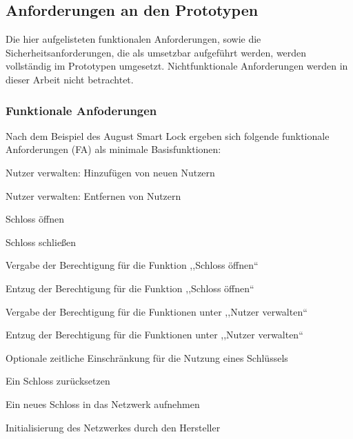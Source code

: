 \subsection{Anforderungen an den Prototypen}
\label{sec:prototype_requirements}
    Die hier aufgelisteten funktionalen Anforderungen, sowie die Sicherheitsanforderungen, die als umsetzbar aufgeführt werden, werden vollständig im Prototypen umgesetzt. 
    Nichtfunktionale Anforderungen werden in dieser Arbeit nicht betrachtet. 
    
\subsubsection{Funktionale Anfoderungen}
\label{sec:prototype_func_req}
    Nach dem Beispiel des August Smart Lock ergeben sich folgende funktionale Anforderungen (FA) als minimale Basisfunktionen:
    \begin{FA}[noitemsep]
        \item \label{fa:1}Nutzer verwalten: Hinzufügen von neuen Nutzern
        \item \label{fa:2}Nutzer verwalten: Entfernen von Nutzern
        \item \label{fa:3}Schloss öffnen
        \item \label{fa:4}Schloss schließen
        \item \label{fa:5}Vergabe der Berechtigung für die Funktion ,,Schloss öffnen``
        \item \label{fa:6}Entzug der Berechtigung für die Funktion ,,Schloss öffnen``
        \item \label{fa:7}Vergabe der Berechtigung für die Funktionen unter ,,Nutzer verwalten``
        \item \label{fa:8}Entzug der Berechtigung für die Funktionen unter ,,Nutzer verwalten``
        \item \label{fa:9}Optionale zeitliche Einschränkung für die Nutzung eines Schlüssels
        \item \label{fa:10}Ein Schloss zurücksetzen
        \item \label{fa:11}Ein neues Schloss in das Netzwerk aufnehmen
        \item \label{fa:12}Initialisierung des Netzwerkes durch den Hersteller
    \end{FA}

\newpage
